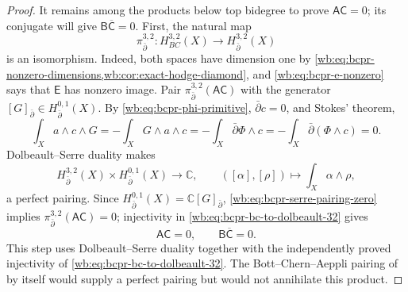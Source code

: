 \begin{proof}
It remains among the products below top bidegree to prove
$\mathsf A\mathsf C=0$; its conjugate will give
$\mathsf B\overline{\mathsf C}=0$.  First, the natural map
\begin{equation}
 \pi_{\bar\partial}^{3,2}\colon H^{3,2}_{BC}(X)
 \longrightarrow H^{3,2}_{\bar\partial}(X)
\label{wb:eq:bcpr-bc-to-dolbeault-32}
\end{equation}
is an isomorphism.  Indeed, both spaces have dimension one by
\cref{wb:eq:bcpr-nonzero-dimensions,wb:cor:exact-hodge-diamond}, and
\cref{wb:eq:bcpr-e-nonzero} says that $\mathsf E$ has nonzero image.
Pair $\pi_{\bar\partial}^{3,2}(\mathsf A\mathsf C)$ with the generator
$[G]_{\bar\partial}\in H^{0,1}_{\bar\partial}(X)$.  By
\cref{wb:eq:bcpr-phi-primitive}, $\bar\partial c=0$, and Stokes' theorem,
\begin{equation}
 \int_Xa\wedge c\wedge G
 =-\int_XG\wedge a\wedge c
 =-\int_X\bar\partial\Phi\wedge c
 =-\int_X\bar\partial(\Phi\wedge c)=0.
\label{wb:eq:bcpr-serre-pairing-zero}
\end{equation}
Dolbeault--Serre duality makes
\begin{equation}
 H^{3,2}_{\bar\partial}(X)\times
 H^{0,1}_{\bar\partial}(X)\longrightarrow\mathbb C,
 \qquad
 ([\alpha],[\rho])\longmapsto\int_X\alpha\wedge\rho,
\label{wb:eq:bcpr-serre-pairing}
\end{equation}
a perfect pairing.  Since
$H^{0,1}_{\bar\partial}(X)=\mathbb C[G]_{\bar\partial}$,
\cref{wb:eq:bcpr-serre-pairing-zero} implies
$\pi_{\bar\partial}^{3,2}(\mathsf A\mathsf C)=0$; injectivity in
\cref{wb:eq:bcpr-bc-to-dolbeault-32} gives
\begin{equation}
 \mathsf A\mathsf C=0,
 \qquad
 \mathsf B\overline{\mathsf C}=0.
\label{wb:eq:bcpr-second-zero-products}
\end{equation}
This step uses Dolbeault--Serre duality together with the independently
proved injectivity of \cref{wb:eq:bcpr-bc-to-dolbeault-32}.  The
Bott--Chern--Aeppli pairing of
\cite[\S2.c]{Schweitzer2007} by itself would supply a perfect pairing but
would not annihilate this product.


\end{proof}
